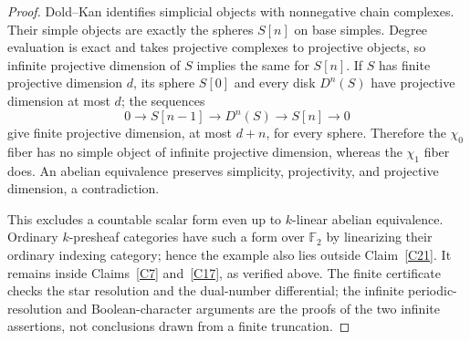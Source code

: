 \begin{proof}
Dold--Kan identifies simplicial objects with nonnegative chain complexes. Their simple objects are exactly the spheres $S[n]$ on base simples. Degree evaluation is exact and takes projective complexes to projective objects, so infinite projective dimension of $S$ implies the same for $S[n]$. If $S$ has finite projective dimension $d$, its sphere $S[0]$ and every disk $D^n(S)$ have projective dimension at most $d$; the sequences
\[
 0\longrightarrow S[n-1]\longrightarrow D^n(S)
 \longrightarrow S[n]\longrightarrow0
\]
give finite projective dimension, at most $d+n$, for every sphere. Therefore the $\chi_0$ fiber has no simple object of infinite projective dimension, whereas the $\chi_1$ fiber does. An abelian equivalence preserves simplicity, projectivity, and projective dimension, a contradiction.

This excludes a countable scalar form even up to $k$-linear abelian equivalence. Ordinary $k$-presheaf categories have such a form over $\mathbb F_2$ by linearizing their ordinary indexing category; hence the example also lies outside Claim~\ref{C21}. It remains inside Claims~\ref{C7} and~\ref{C17}, as verified above. The finite certificate checks the star resolution and the dual-number differential; the infinite periodic-resolution and Boolean-character arguments are the proofs of the two infinite assertions, not conclusions drawn from a finite truncation.
\end{proof}

